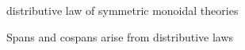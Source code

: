 %
%
%
%
%
%
%
%
%
%
%
%
%



\begin{definition}
distributive law of symmetric monoidal theories
\end{definition}


Spans and cospans arise from distributive laws





